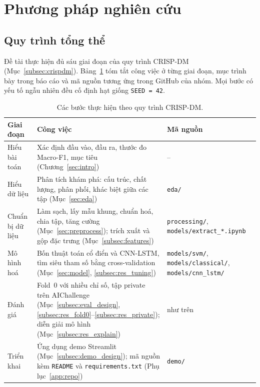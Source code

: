 \section{Phương pháp nghiên cứu}
\label{sec:method}

\subsection{Quy trình tổng thể}
\label{subsec:pipeline}

Đề tài thực hiện đủ sáu giai đoạn của quy trình CRISP-DM (Mục~\ref{subsec:crispdm}). Bảng~\ref{tab:pipeline} tóm tắt công việc ở từng giai đoạn, mục trình bày trong báo cáo và mã nguồn tương ứng trong GitHub của nhóm. Mọi bước có yếu tố ngẫu nhiên đều cố định hạt giống \texttt{SEED = 42}.

\begin{table}[H]
  \centering
  \caption{Các bước thực hiện theo quy trình CRISP-DM.}
  \label{tab:pipeline}
  \small
  \begin{tabular}{@{}p{}p{}p{}@{}}
    \toprule
    \textbf{Giai đoạn} & \textbf{Công việc} & \textbf{Mã nguồn} \\
    \midrule
    Hiểu bài toán & Xác định đầu vào, đầu ra, thước đo Macro-F1, mục tiêu (Chương~\ref{sec:intro}) & -- \\
    Hiểu dữ liệu & Phân tích khám phá: cấu trúc, chất lượng, phân phối, khác biệt giữa các tập (Mục~\ref{sec:eda}) & \texttt{eda/} \\
    Chuẩn bị dữ liệu & Làm sạch, lấy mẫu khung, chuẩn hoá, chia tập, tăng cường (Mục~\ref{sec:preprocess}); trích xuất và gộp đặc trưng (Mục~\ref{subsec:features}) & \texttt{processing/}, \texttt{models/extract\_*.ipynb} \\
    Mô hình hoá & Bốn thuật toán cổ điển và CNN-LSTM, tìm siêu tham số bằng cross-validation (Mục~\ref{sec:model}, \ref{subsec:res_tuning}) & \texttt{models/svm/}, \texttt{models/classical/}, \texttt{models/cnn\_lstm/} \\
    Đánh giá & Fold~0 với nhiều chỉ số, tập private trên AIChallenge (Mục~\ref{subsec:eval_design}, \ref{subsec:res_fold0}--\ref{subsec:res_private}); diễn giải mô hình (Mục~\ref{subsec:res_explain}) & như trên \\
    Triển khai & Ứng dụng demo Streamlit (Mục~\ref{subsec:demo_design}); mã nguồn kèm \texttt{README} và \texttt{requirements.txt} (Phụ lục~\ref{app:repo}) & \texttt{demo/} \\
    \bottomrule
  \end{tabular}
\end{table}

